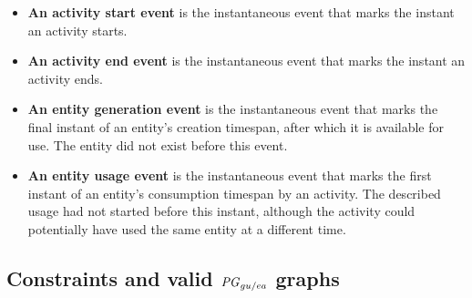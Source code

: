 \begin{itemize} %
	\item\textbf{An activity start event} is the instantaneous event that marks the instant an activity starts.
	
	\item\textbf{An activity end event} is the instantaneous event that marks the instant an activity ends.
	
	\item\textbf{An entity generation event} is the instantaneous event that marks the final instant of an entity's creation timespan, after which it is available for use. The entity did not exist before this event.
	
	\item\textbf{An entity usage event}  is the instantaneous event that marks the first instant of an entity's consumption timespan by an activity. The described usage had not started before this instant, although the activity could potentially have used the same entity at a different time.
	
	
\end{itemize}



\subsection{Constraints and valid $\mathit{PG}_{gu/ea}$ graphs}
\label{sec:prov-constraints}

